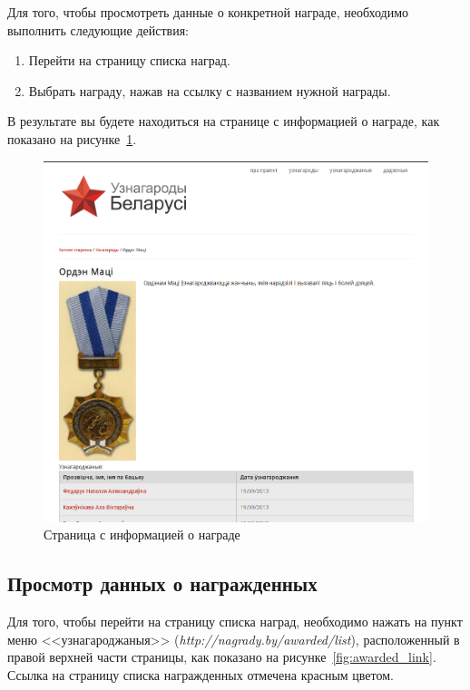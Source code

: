 Для того, чтобы просмотреть данные о конкретной награде,
необходимо выполнить следующие действия:
\begin{enumerate}
\item Перейти на страницу списка наград.
\item Выбрать награду, нажав на ссылку с названием нужной награды. 
\end{enumerate}

В результате вы будете находиться на странице с информацией о награде, 
как показано на рисунке~\ref{fig:awards_info}.

\begin{figure}[h]
  \centering
  \includegraphics[width=160mm]{pic/help_awards_info.png}
  \caption{Страница с информацией о награде}
  \label{fig:awards_info}
\end{figure}

\subsection{Просмотр данных о награжденных}
\label{ssec:help_awarded_list}

Для того, чтобы перейти на страницу списка наград,
необходимо нажать на пункт меню <<узнагароджаныя>> (\textit{http://nagrady.by/awarded/list}),
расположенный в правой верхней части страницы, 
как показано на рисунке~\ref{fig:awarded_link}.
Ссылка на страницу списка награжденных отмечена красным цветом.

